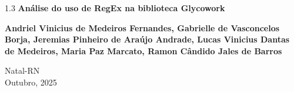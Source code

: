 \begin{titlepage}
\begin{center}
		\vspace{6cm}
						
		{\setlength{\baselineskip}%
		{1.3\baselineskip}
		{\LARGE \textbf{Análise do uso de RegEx na biblioteca Glycowork}}\par}
			
		\vspace{3cm}
			
		{\large \textbf{Andriel Vinicius de Medeiros Fernandes, Gabrielle de Vasconcelos Borja, Jeremias Pinheiro de Araújo Andrade, Lucas Vinicius Dantas de Medeiros, Maria Paz Marcato, Ramon Cândido Jales de Barros}}
						
		\vspace{6cm}
		
		Natal-RN\\Outubro, 2025 
	\end{center}
\end{titlepage}
